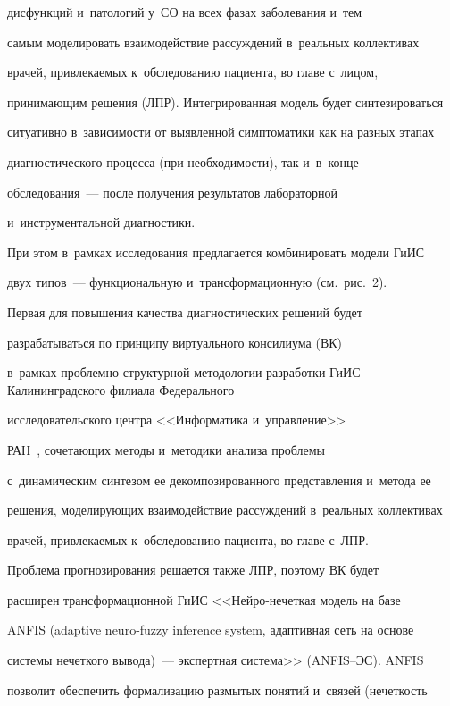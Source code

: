 дисфункций и~патологий у~СО на всех фазах заболевания и~тем 

самым моделировать взаимодействие рассуждений в~реальных коллективах 

врачей, привлекаемых к~обследованию пациента, во главе с~лицом, 

принимающим решения (ЛПР). Интегрированная модель будет синтезироваться 

ситуативно в~зависимости от выявленной симптоматики как на разных этапах 

диагностического процесса (при необходимости), так и~в~конце 

обследования~--- после получения результатов лабораторной 

и~инструментальной диагностики.


  При этом в~рамках исследования предлагается комбинировать модели ГиИС 

двух типов~--- функциональную и~трансформационную (см.\ рис.~2). 

  

  Первая для повышения качества диагностических решений будет 

разрабатываться по принципу виртуального консилиума (ВК)~\cite{4-rum} 

в~рамках проб\-лем\-но-струк\-тур\-ной методологии разработки ГиИС Калининградского филиала Федерального 

исследовательского центра <<Информатика и~управ\-ле\-ние>>  

РАН~\cite{5-rum}, сочетающих методы и~методики анализа проб\-ле\-мы 

с~динамическим синтезом ее декомпозированного представления и~метода ее 

решения, моделирующих взаимодействие рассуждений в~реальных коллективах 

врачей, привлекаемых к~обследованию пациента, во главе с~ЛПР. 

  

  Проблема прогнозирования решается также ЛПР, поэтому ВК будет 

расширен трансформационной ГиИС <<Ней\-ро-не\-чет\-кая модель на базе 

ANFIS (adaptive neuro-fuzzy inference system, адаптивная сеть на основе 

системы нечеткого вывода)~--- экспертная система>> (ANFIS--ЭС). ANFIS 

позволит обеспечить формализацию размытых понятий и~связей (нечеткость 

